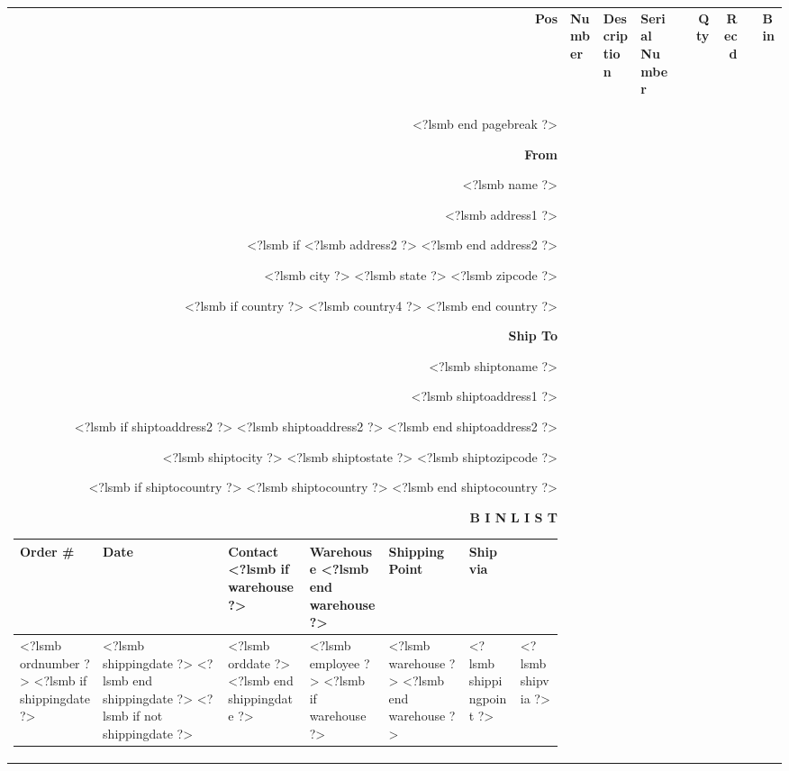 \documentclass[twoside]{scrartcl}
\begin{document}
\begin{tabularx}{\textwidth}{@{}rlXllrrll@{}}
  \textbf{Pos} & \textbf{Number} & \textbf{Description} & \textbf{Serial Number} & & \textbf{Qty} & \textbf{Recd} & & \textbf{Bin} \\
<?lsmb end pagebreak ?>


\vspace*{0.5cm}

\parbox[t]{1cm}{\hfill}
\parbox[t]{.5\textwidth}{
\textbf{From}
\vspace{0.7cm}

<?lsmb name ?>

<?lsmb address1 ?>

<?lsmb if %
<?lsmb address2 ?>
<?lsmb end address2 ?>

<?lsmb city ?> <?lsmb state ?> <?lsmb zipcode ?>

<?lsmb if country ?>
<?lsmb country4 ?>
<?lsmb end country ?>
}
\parbox[t]{.4\textwidth}{
\textbf{Ship To}
\vspace{0.7cm}

<?lsmb shiptoname ?>

<?lsmb shiptoaddress1 ?>

<?lsmb if shiptoaddress2 ?>
<?lsmb shiptoaddress2 ?>
<?lsmb end shiptoaddress2 ?>

<?lsmb shiptocity ?> <?lsmb shiptostate ?> <?lsmb shiptozipcode ?>

<?lsmb if shiptocountry ?>
<?lsmb shiptocountry ?>
<?lsmb end shiptocountry ?>
}
\hfill

\vspace{1cm}

\textbf{B I N} \parbox{0.3cm}{\hfill} \textbf{L I S T}
\hfill

\vspace{1cm}

\begin{tabularx}{\textwidth}{*{6}{|X}|} \hline
  \textbf{Order \#} & \textbf{Date} & \textbf{Contact}
  <?lsmb if warehouse ?>
  & \textbf{Warehouse}
  <?lsmb end warehouse ?>
  & \textbf{Shipping Point} & \textbf{Ship via} \\ [0.5em]
  \hline
  
  <?lsmb ordnumber ?>
  <?lsmb if shippingdate ?>
  & <?lsmb shippingdate ?>
  <?lsmb end shippingdate ?>
  <?lsmb if not shippingdate ?>
  & <?lsmb orddate ?>
  <?lsmb end shippingdate ?>
  & <?lsmb employee ?>
  <?lsmb if warehouse ?>
  & <?lsmb warehouse ?>
  <?lsmb end warehouse ?>
  & <?lsmb shippingpoint ?> & <?lsmb shipvia ?> \\
  \hline
\end{tabularx}
  

\end{tabularx}
\end{document}

